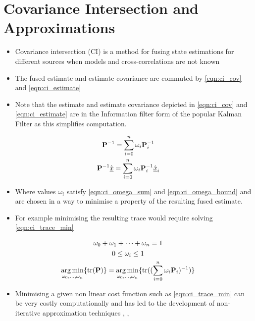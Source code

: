 \documentclass[letterpaper, 10 pt, conference]{ieeeconf}  %
\begin{document}
\section{Covariance Intersection and Approximations} \label{sec:ci}
\begin{itemize}
   \item Covariance intersection (CI) is a method for fusing state estimations for different sources when models and cross-correlations are not known
   \item The fused estimate and estimate covariance are commuted by \eqref{eqn:ci_cov} and \eqref{eqn:ci_estimate}
   \item Note that the estimate and estimate covariance depicted in \eqref{eqn:ci_cov} and \eqref{eqn:ci_estimate} are in the Information filter form of the popular Kalman Filter as this simplifies computation.
\end{itemize}
\begin{gather}
   {\ensuremath{{\mathbf{P}}}}^{-1}=\sum_{i=0}^{n}\omega_i {{\mathbf{P}}}_i^{-1} \label{eqn:ci_cov}\\
   {{\mathbf{P}}}^{-1} \hat{{\underline{x}}} =\sum_{i=0}^{n}\omega_i {{\mathbf{P}}}_i^{-1} \hat{{\underline{x}}}_i \label{eqn:ci_estimate}
\end{gather}
\begin{itemize}
   \item Where values $\omega_i$ satisfy \eqref{eqn:ci_omega_sum} and \eqref{eqn:ci_omega_bound} and are chosen in a way to minimise a property of the resulting fused estimate. 
   \item For example minimising the resulting trace would require solving \eqref{eqn:ci_trace_min}
\end{itemize}
\begin{gather}
   \omega_0 + \omega_1 + \cdots + \omega_n = 1 \label{eqn:ci_omega_sum}\\
   0 \leq \omega_i \leq 1 \label{eqn:ci_omega_bound}\\
   \operatorname*{arg\,min}_{\omega_0,\dots,\omega_n} \{\operatorname{tr}({{\mathbf{P}}})\} = \operatorname*{arg\,min}_{\omega_0,\dots,\omega_n} \{\operatorname{tr}((\sum_{i=0}^{n}\omega_i {{\mathbf{P}}}_i)^{-1})\} \label{eqn:ci_trace_min}
\end{gather}
\begin{itemize}
   \item Minimising a given non linear cost function such as \eqref{eqn:ci_trace_min} can be very costly computationally and has led to the development of non-iterative approximation techniques \cite{niehsenInformationFusionBased2002}, \cite{frankenImprovedFastCovariance2005}, \cite{congOrderInsensitiveSequential2016}
\end{itemize}
\end{document}
